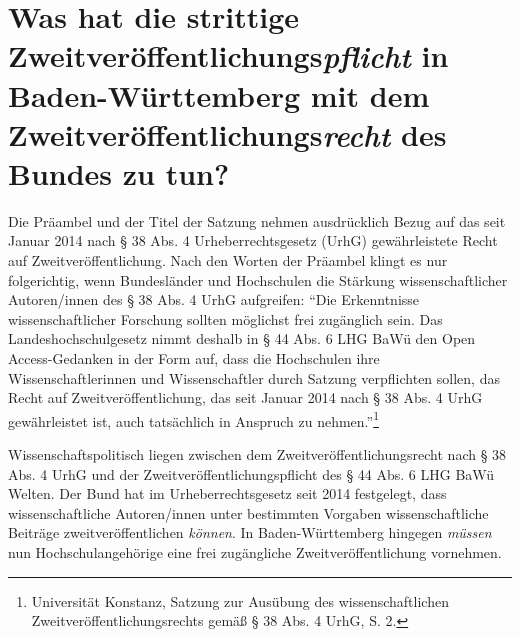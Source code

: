 \documentclass[a4paper,
fontsize=11pt,
oneside,
numbers=noperiodatend,
parskip=half-,
bibliography=totoc,
final
]{scrartcl}
\begin{document}
\hypertarget{was-hat-die-strittige-zweitveruxf6ffentlichungspflicht-in-baden-wuxfcrttemberg-mit-dem-zweitveruxf6ffentlichungsrecht-des-bundes-zu-tun}{%
\section*{\texorpdfstring{Was hat die strittige
Zweit\-ver\-öffent\-lich\-ungs\-\emph{pflicht} in Baden-Württemberg mit dem
Zweit\-ver\-öffent\-lich\-ungs\-\emph{recht} des Bundes zu
tun?}{Was hat die strittige Zweit\-ver\-öffent\-lich\-ungs\-pflicht in Baden-Württemberg mit dem Zweit\-ver\-öffent\-lich\-ungs\-recht des Bundes zu tun?}}\label{was-hat-die-strittige-zweitveruxf6ffentlichungspflicht-in-baden-wuxfcrttemberg-mit-dem-zweitveruxf6ffentlichungsrecht-des-bundes-zu-tun}}

Die Präambel und der Titel der Satzung nehmen ausdrücklich Bezug auf das
seit Januar 2014 nach § 38 Abs. 4 Urheberrechtsgesetz (UrhG)
gewährleistete Recht auf Zweitveröffentlichung. Nach den Worten der
Präambel klingt es nur folgerichtig, wenn Bundesländer und Hochschulen
die Stärkung wissenschaftlicher Autoren/innen des § 38 Abs. 4 UrhG
aufgreifen: \enquote{Die Erkenntnisse wissenschaftlicher Forschung
sollten möglichst frei zugänglich sein. Das Landeshochschulgesetz nimmt
deshalb in § 44 Abs. 6 LHG BaWü den Open Access-Gedanken in der Form
auf, dass die Hochschulen ihre Wissenschaftlerinnen und Wissenschaftler
durch Satzung verpflichten sollen, das Recht auf Zweitveröffentlichung,
das seit Januar 2014 nach § 38 Abs. 4 UrhG gewährleistet ist, auch
tatsächlich in Anspruch zu nehmen.}\footnote{Universität Konstanz,
  Satzung zur Ausübung des wissenschaftlichen
  Zweit\-ver\-öffent\-lich\-ungs\-rechts gemäß § 38 Abs. 4 UrhG, S. 2.}

Wissenschaftspolitisch liegen zwischen dem Zweit\-ver\-öffent\-lich\-ungs\-recht
nach § 38 Abs. 4 UrhG und der Zweit\-ver\-öffent\-lich\-ungs\-pflicht des § 44
Abs. 6 LHG BaWü Welten. Der Bund hat im Urheberrechtsgesetz seit 2014
festgelegt, dass wissenschaftliche Autoren/innen unter bestimmten
Vorgaben wissenschaftliche Beiträge zweitveröffentlichen \emph{können}.
In Baden-Württemberg hingegen \emph{müssen} nun Hochschulangehörige eine
frei zugängliche Zweitveröffentlichung vornehmen.
\end{document}
